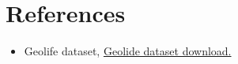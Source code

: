 \documentclass[../main]{subfiles}
\begin{document}
\section{References}
    \begin{itemize}
        \item Geolife dataset,\label{ref:geolife} \href{https://www.microsoft.com/en-us/download/details.aspx?id=52367&from=https%3A%2F%2Fresearch.microsoft.com%2Fen-us%2Fdownloads%2Fb16d359d-d164-469e-9fd4-daa38f2b2e13%2F}{Geolide dataset download.}
    \end{itemize}
\end{document}
